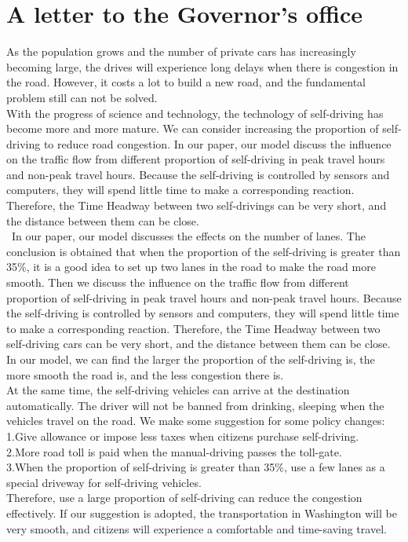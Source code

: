 \documentclass[UTF8]{mcmthesis}
\begin{document}
\section{A letter to the Governor's office}
As the population grows and the number of private cars has increasingly becoming large, the drives will experience long delays when there is congestion in the road. However, it costs a lot to build a new road, and the fundamental problem still can not be solved.\\
\indent With the progress of science and technology, the technology of self-driving has become more and more mature. We can consider increasing the proportion of self-driving to reduce road congestion.
In our paper, our model discuss the influence on the traffic flow from different proportion of self-driving in peak travel hours and non-peak travel hours. Because the self-driving is controlled by sensors and computers, they will spend little time to make a corresponding reaction. Therefore, the Time Headway between two self-drivings can be very short, and the distance between them can be close.\\ \
\indent In our paper, our model discusses the effects on the number of lanes. The conclusion is obtained that when the proportion of the self-driving is greater than 35\%, it is a good idea to set up two lanes in the road to make the road more smooth. Then we discuss the influence on the traffic flow from different proportion of self-driving in peak travel hours and non-peak travel hours. Because the self-driving is controlled by sensors and computers, they will spend little time to make a corresponding reaction. Therefore, the Time Headway between two self-driving cars can be very short, and the distance between them can be close. In our model, we can find the larger the proportion of the self-driving is, the more smooth the road is, and the less congestion there is. \\
\indent At the same time, the self-driving vehicles can arrive at the destination automatically. The driver will not be banned from drinking, sleeping when the vehicles travel on the road.
We make some suggestion for some policy changes:\\
\indent 1.Give allowance or impose less taxes when citizens purchase self-driving.\\
\indent 2.More road toll is paid when the manual-driving passes the toll-gate.\\
\indent 3.When the proportion of self-driving is greater than 35\%, use a few lanes as a special driveway for self-driving vehicles.\\
\indent Therefore, use a large proportion of self-driving can reduce the congestion effectively. If our suggestion is adopted, the transportation in Washington will be very smooth, and citizens will experience a comfortable and time-saving travel. 
\end{document}
